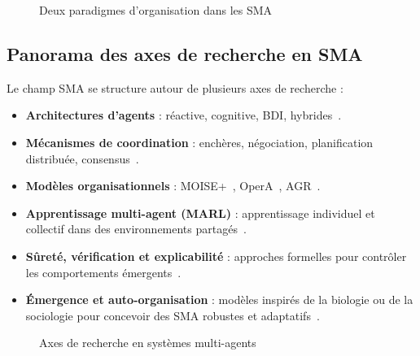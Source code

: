 \documentclass[ twoside,openright,titlepage,numbers=noenddot,headinclude,%
                footinclude=true,cleardoublepage=empty,abstractoff, %
                BCOR=5mm,paper=a4,fontsize=11pt,%
                french,american,%
                ]{scrreprt}
\begin{document}
\begin{figure}[h]
    \centering
    \caption{Deux paradigmes d'organisation dans les SMA}
    \label{fig:auto_vs_topdown}
\end{figure}

\subsection*{Panorama des axes de recherche en SMA}

Le champ SMA se structure autour de plusieurs axes de recherche :

\begin{itemize}
    \item \textbf{Architectures d'agents} : réactive, cognitive, BDI, hybrides~\cite{Georgeff1999}.
    \item \textbf{Mécanismes de coordination} : enchères, négociation, planification distribuée, consensus~\cite{Sandholm1999,Durfee1999}.
    \item \textbf{Modèles organisationnels} : MOISE+~\cite{Hubner2002,Hannoun2000}, OperA~\cite{Dignum2004}, AGR~\cite{Ferber2003}.
    \item \textbf{Apprentissage multi-agent (MARL)} : apprentissage individuel et collectif dans des environnements partagés~\cite{Zhang2021}.
    \item \textbf{Sûreté, vérification et explicabilité} : approches formelles pour contrôler les comportements émergents~\cite{Boella2008}.
    \item \textbf{Émergence et auto-organisation} : modèles inspirés de la biologie ou de la sociologie pour concevoir des SMA robustes et adaptatifs~\cite{DiMarzoSerugendo2005,Heylighen2001}.
\end{itemize}

\begin{figure}[h]
    \centering
    \caption{Axes de recherche en systèmes multi-agents}
    \label{fig:panorama_sma}
\end{figure}
\end{document}
